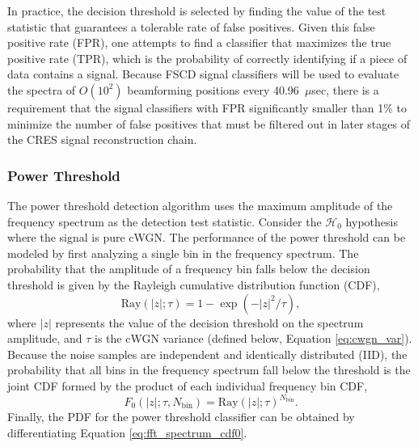 In practice, the decision threshold is selected by finding the value of the test statistic that guarantees a tolerable rate of false positives. Given this false positive rate (FPR), one attempts to find a classifier that maximizes the true positive rate (TPR), which is the probability of correctly identifying if a piece of data contains a signal. Because FSCD signal classifiers will be used to evaluate the spectra of $O(10^2)$ beamforming positions every 40.96~$\mu$sec, there is a requirement that the signal classifiers with FPR significantly smaller than 1\% to minimize the number of false positives that must be filtered out in later stages of the CRES signal reconstruction chain.

\subsubsection{Power Threshold}

The power threshold detection algorithm uses the maximum amplitude of the frequency spectrum as the detection test statistic. Consider the $\mathcal{H}_0$ hypothesis where the signal is pure cWGN. The performance of the power threshold can be modeled by first analyzing a single bin in the frequency spectrum. The probability that the amplitude of a frequency bin falls below the decision threshold is given by the Rayleigh cumulative distribution function (CDF),
\begin{equation}
    \mathrm{Ray}(|z|;\tau)=1-\exp{\left(-|z|^2/\tau\right)},
\end{equation}
where $|z|$ represents the value of the decision threshold on the spectrum amplitude, and $\tau$ is the cWGN variance (defined below, Equation \ref{eq:cwgn_var}). Because the noise samples are independent and identically distributed (IID), the probability that all bins in the frequency spectrum fall below the threshold is the joint CDF formed by the product of each individual frequency bin CDF,
\begin{equation}
    F_0(|z|;\tau, N_\mathrm{bin})=\mathrm{Ray}(|z|;\tau)^{N_\textrm{bin}}.
    \label{eq:fft_spectrum_cdf0}
\end{equation}
Finally, the PDF for the power threshold classifier can be obtained by differentiating Equation \ref{eq:fft_spectrum_cdf0}.

